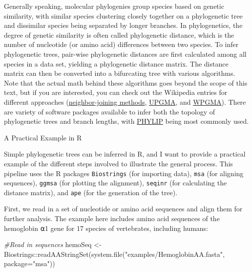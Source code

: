 \documentclass[
]{book}
\newenvironment{Shaded}{\begin{snugshade}}{\end{snugshade}}
\newcommand{\AttributeTok}[1]{\textcolor[rgb]{0.77,0.63,0.00}{#1}}
\newcommand{\CommentTok}[1]{\textcolor[rgb]{0.56,0.35,0.01}{\textit{#1}}}
\newcommand{\FunctionTok}[1]{\textcolor[rgb]{0.00,0.00,0.00}{#1}}
\newcommand{\NormalTok}[1]{#1}
\newcommand{\OtherTok}[1]{\textcolor[rgb]{0.56,0.35,0.01}{#1}}
\newcommand{\SpecialCharTok}[1]{\textcolor[rgb]{0.00,0.00,0.00}{#1}}
\newcommand{\StringTok}[1]{\textcolor[rgb]{0.31,0.60,0.02}{#1}}
\begin{document}
Generally speaking, molecular phylogenies group species based on genetic similarity, with similar species clustering closely together on a phylogenetic tree and dissimilar species being separated by longer branches. In phylogenetics, the degree of genetic similarity is often called phylogenetic distance, which is the number of nucleotide (or amino acid) differences between two species. To infer phylogenetic trees, pair-wise phylogenetic distances are first calculated among all species in a data set, yielding a phylogenetic distance matrix. The distance matrix can then be converted into a bifurcating tree with various algorithms. Note that the actual math behind these algorithms goes beyond the scope of this text, but if you are interested, you can check out the Wikipedia entries for different approaches (\href{https://en.wikipedia.org/wiki/Neighbor_joining}{neighbor-joining methods}, \href{https://en.wikipedia.org/wiki/UPGMA}{UPGMA}, and \href{https://en.wikipedia.org/wiki/WPGMA}{WPGMA}). There are variety of software packages available to infer both the topology of phylogenetic trees and branch lengths, with \href{https://evolution.genetics.washington.edu/phylip.html}{PHYLIP} being most commonly used.

A Practical Example in R

Simple phylogenetic trees can be inferred in R, and I want to provide a practical example of the different steps involved to illustrate the general process. This pipeline uses the R packages \texttt{Biostrings} (for importing data), \texttt{msa} (for aligning sequences), \texttt{ggmsa} (for plotting the alignment), \texttt{seqinr} (for calculating the distance matrix), and \texttt{ape} (for the generation of the tree).

First, we read in a set of nucleotide or amino acid sequences and align them for further analysis. The example here includes amino acid sequences of the hemoglobin ⍺1 gene for 17 species of vertebrates, including humans:

\begin{Shaded}
\begin{Highlighting}[]
\CommentTok{\#Read in sequences}
\NormalTok{hemoSeq }\OtherTok{\textless{}{-}}\NormalTok{ Biostrings}\SpecialCharTok{::}\FunctionTok{readAAStringSet}\NormalTok{(}\FunctionTok{system.file}\NormalTok{(}\StringTok{"examples/HemoglobinAA.fasta"}\NormalTok{, }\AttributeTok{package=}\StringTok{"msa"}\NormalTok{))}
\end{Highlighting}
\end{Shaded}
\end{document}
